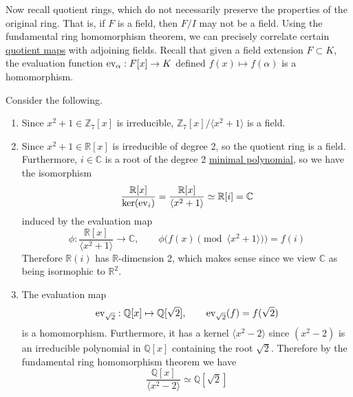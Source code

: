   Now recall quotient rings, which do not necessarily preserve the properties of the original ring. That is, if $F$ is a field, then $F/I$ may not be a field. Using the fundamental ring homomorphism theorem, we can precisely correlate certain \hyperref[pst-def:quotient-map]{quotient maps} with adjoining fields. Recall that given a field extension $F \subset K$, the evaluation function $\operatorname{ev}_\alpha: F[x] \rightarrow K$ defined $f(x) \mapsto f(\alpha)$ is a homomorphism. 

  \begin{example}
    \label{ex:simple-quotient-rings-as-field-adjoined-with-1}
    Consider the following. 
    \begin{enumerate}
      \item Since $x^2 + 1 \in \mathbb{Z}_7 [x]$ is irreducible, $\mathbb{Z}_7 [x] / \langle x^2 + 1 \rangle$ is a field. 

      \item Since $x^2 + 1 \in \mathbb{R}[x]$ is irreducible of degree 2, so the quotient ring is a field. Furthermore, $i \in \mathbb{C}$ is a root of the degree 2 \hyperref[def:min_poly]{minimal polynomial}, so we have the isomorphism 
      \begin{equation}
        \frac{\mathbb{R}[x]}{\ker(\operatorname{ev}_i)} = \frac{\mathbb{R}[x]}{\langle x^2 + 1 \rangle} \simeq \mathbb{R}[i] = \mathbb{C}
      \end{equation}
      induced by the evaluation map
      \begin{equation}
        \phi: \frac{\mathbb{R}[x]}{\langle x^2 + 1 \rangle} \rightarrow \mathbb{C}, \qquad \phi\big( f(x) \pmod{\langle x^2 + 1 \rangle} \big) = f(i)
      \end{equation}
      Therefore $\mathbb{R}(i)$ has $\mathbb{R}$-dimension 2, which makes sense since we view $\mathbb{C}$ as being isormophic to $\mathbb{R}^2$. 

      \item The evaluation map 
      \begin{equation}
        \operatorname{ev}_{\sqrt{2}}: \mathbb{Q}[x] \mapsto \mathbb{Q}[\sqrt{2}], \qquad \operatorname{ev}_{\sqrt{2}} (f) = f(\sqrt{2}) 
      \end{equation}
      is a homomorphism. Furthermore, it has a kernel $\langle x^2 - 2 \rangle$ since $(x^2 - 2)$ is an irreducible polynomial in $\mathbb{Q}[x]$ containing the root $\sqrt{2}$. Therefore by the fundamental ring homomorphism theorem we have 
      \begin{equation}
        \frac{\mathbb{Q}[x]}{\langle x^2 - 2 \rangle} \simeq \mathbb{Q}[\sqrt{2}]
      \end{equation}
    \end{enumerate}
  \end{example}

